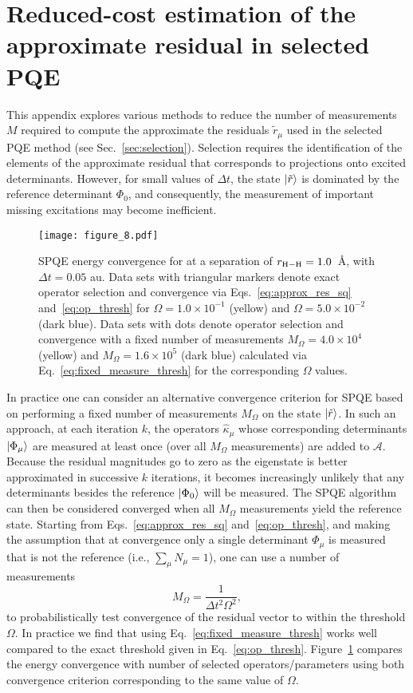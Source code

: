 \documentclass[aps,prx, reprint]{revtex4-2}
\begin{document}
\section{Reduced-cost estimation of the approximate residual in selected PQE}
\label{apdx:aa_reduce_cost}

This appendix explores various methods to reduce the number of measurements $M$ required to compute the approximate the residuals $\tilde{r}_\mu$ used in the selected PQE method (see  Sec.~\ref{sec:selection}).
Selection requires the identification of the elements of the approximate residual that corresponds to projections onto excited determinants. However, for small values of $\Delta t$, the state $\ket{\tilde{r}}$ is dominated by the reference determinant $\Phi_0$, and consequently, the measurement of important missing excitations may become inefficient.
\begin{figure}[h!]
\centering
\texttt{[image: figure\_8.pdf]}
\caption{SPQE energy convergence for  at a separation of $r_{\rm{H-H}} = 1.0$~\AA, with $\Delta t = 0.05$ au. Data sets with triangular markers denote exact operator selection and convergence via Eqs.~\eqref{eq:approx_res_sq} and~\eqref{eq:op_thresh} for $\Omega = 1.0\times10^{-1}$ (yellow) and $\Omega = 5.0\times10^{-2}$ (dark blue). Data sets with dots denote operator selection and convergence with a fixed number of measurements $M_{\Omega} = 4.0\times10^{4}$ (yellow) and $M_{\Omega} = 1.6\times10^{5}$ (dark blue) calculated via Eq.~\eqref{eq:fixed_measure_thresh} for the corresponding $\Omega$ values.}
\label{fig:Momega}
\end{figure}
In practice one can consider an alternative convergence criterion for SPQE based on performing a fixed number of measurements $M_{\Omega}$ on the state $\ket{\tilde{r}}$.
In such an approach, at each iteration $k$, the operators $\hat{\kappa}_\mu$ whose corresponding determinants $\ket{\Phi_\mu}$ are measured at least once (over all $M_{\Omega}$ measurements) are added to $\mathcal{A}$.
Because the residual magnitudes go to zero as the eigenstate is better approximated in successive $k$ iterations, it becomes increasingly unlikely that any determinants besides the reference $\ket{ \Phi_0 }$ will be measured.
The SPQE algorithm can then be considered converged when all $M_{\Omega}$ measurements yield the reference state.
Starting from Eqs.~\eqref{eq:approx_res_sq} and~\eqref{eq:op_thresh}, and making the assumption that at convergence only a single determinant $\Phi_\mu$ is measured that is not the reference (i.e., $\sum_\mu N_\mu = 1$), one can use a number of measurements
\begin{equation}
\label{eq:fixed_measure_thresh}
M_\Omega = \frac{1}{\Delta t^2 \Omega^2},
\end{equation}
to probabilistically test convergence of the residual vector to within the threshold $\Omega$.
In practice we find that using Eq.~\eqref{eq:fixed_measure_thresh} works well compared to the exact threshold given in Eq.~\eqref{eq:op_thresh}.
Figure~\ref{fig:Momega} compares the energy convergence with number of selected operators/parameters using both convergence criterion corresponding to the same value of $\Omega$.


\end{document}
